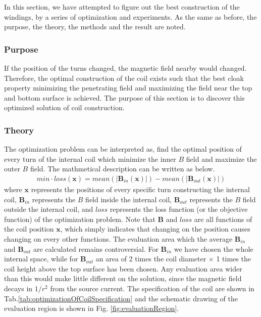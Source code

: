 In this section, we have attempted to figure out the best construction of the windings,
by a series of optimization and experiments.
As the same as before, the purpose, the theory, the methods and the result are noted.


\subsubsection{Purpose}
If the position of the turns changed, the magnetic field nearby would changed.
Therefore, the optimal construction of the coil exists such that
the best cloak property minimizing the penetrating field and maximizing the field near the top and bottom surface is achieved.
The purpose of this section is to discover this optimized solution of coil construction.


\subsubsection{Theory}
The optimization problem can be interpreted as, find the optimal position of every turn of the internal coil which minimize the inner $B$ field and maximize the outer $B$ field.
The mathmetical description can be written as below.
\begin{eqnarray}
  min\cdot loss(\mathbf{x}) = mean\left(|\mathbf{B}_{in}(\mathbf{x})|\right) - mean\left(|\mathbf{B}_{out}(\mathbf{x})|\right)
\end{eqnarray}
where $\mathbf{x}$ represents the positions of every specific turn constructing the internal coil,
$\mathbf{B}_{in}$ represents the $B$ field inside the internal coil,
$\mathbf{B}_{out}$ represents the $B$ field outside the internal coil,
and $loss$ represents the loss function (or the objective function) of the optimization problem.
Note that $\mathbf{B}$ and $loss$ are all functions of the coil position $\mathbf{x}$,
which simply indicates that changing on the position causes changing on every other functions.
The evaluation area which the average $\mathbf{B}_{in}$ and $\mathbf{B}_{out}$ are calculated remains controversial.
For $\mathbf{B}_{in}$ we have chosen the whole internal space,
while for $\mathbf{B}_{out}$ an area of 2 times the coil diameter $\times$ 1 times the coil height above the top surface has been chosen.
Any evaluation area wider than this would make little different on the solution,
since the magnetic field decays in $1/r^2$ from the source current.
The specification of the coil are shown in Tab.\ref{tab:optimizationOfCoilSpecification}
and the schematic drawing of the evaluation region is shown in Fig. \ref{fig:evaluationRegion}.
